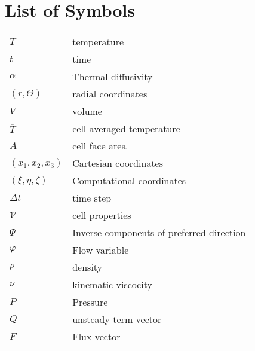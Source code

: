 
\renewcommand{\nomname}{List of Symbols}
 


\section*{List of Symbols}
\noindent
\begin{tabularx}{\linewidth}{@{} l X @{}}
$T$  &  temperature \\
$t$  & time \\
$\alpha$  &  Thermal diffusivity\\
$(r,\Theta)$  &  radial coordinates \\
$V$    &  volume \\
$\overline{T}$  &  cell averaged temperature \\
$A$  &  cell face area \\
$(x_1,x_2,x_3)$  &  Cartesian coordinates\\
$(\xi,\eta,\zeta)$  &  Computational coordinates\\
$\Delta t$  &  time step\\
$\mathcal{V}$  &  cell properties\\
$\Psi$  &  Inverse components of preferred direction\\
$\varphi$  &  Flow variable\\
$\rho$ & density\\
$\nu$ & kinematic viscocity\\
$P$ & Pressure\\
$Q$ & unsteady term vector\\
$F$ & Flux vector\\


\end{tabularx}

